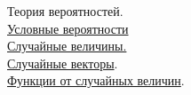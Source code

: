 \documentclass[a4paper]{article}
\begin{document}
Теория вероятностей. \\


\underline{Условные вероятности} \\


\underline{Случайные величины.} \\


\underline{Случайные векторы}. \\


\underline{Функции от случайных величин}. \\

\end{document}

